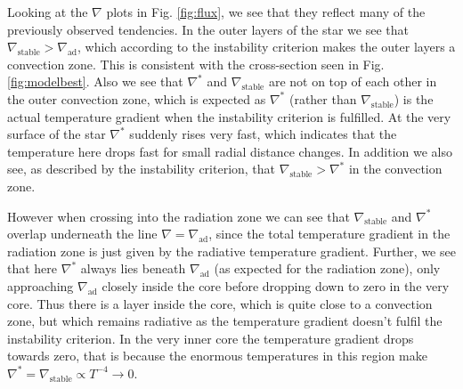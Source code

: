 \documentclass{emulateapj}
\begin{document}
	Looking at the $\nabla$ plots in Fig. \ref{fig:flux}, we see that they reflect many of the previously observed tendencies. In the outer layers of the star we see that $\nabla_\text{stable}>\nabla_\text{ad}$, which according to the instability criterion makes the outer layers a convection zone. This is consistent with the cross-section seen in Fig. \ref{fig:modelbest}. Also we see that $\nabla^*$ and $\nabla_\text{stable}$ are not on top of each other in the outer convection zone, which is expected as $\nabla^*$ (rather than $\nabla_\text{stable}$) is the actual temperature gradient when the instability criterion is fulfilled. At the very surface of the star $\nabla^*$ suddenly rises very fast, which indicates that the temperature here drops fast for small radial distance changes. In addition we also see, as described by the instability criterion, that $\nabla_\text{stable}>\nabla^*$  in the convection zone. 
	
	However when crossing into the radiation zone we can see that $\nabla_\text{stable}$ and $\nabla^*$ overlap underneath the line $\nabla = \nabla_\text{ad}$, since the total temperature gradient in the radiation zone is just given by the radiative temperature gradient. Further, we see that here $\nabla^*$ always lies beneath $\nabla_\text{ad}$ (as expected for the radiation zone), only approaching $\nabla_\text{ad}$ closely inside the core before dropping down to zero in the very core. Thus there is a layer inside the core, which is quite close to a convection zone, but which remains radiative as the temperature gradient doesn't fulfil the instability criterion. In the very inner core the temperature gradient drops towards zero, that is because the enormous temperatures in this region make $\nabla^*=\nabla_\text{stable} \propto T^{-4}\rightarrow 0$.
	
\end{document}
